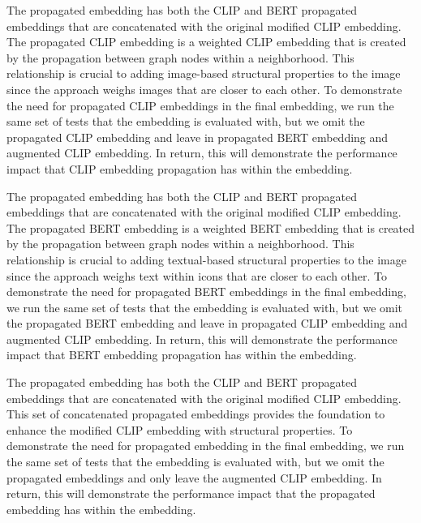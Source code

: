 
The propagated embedding has both the CLIP and BERT propagated embeddings that are concatenated with the original modified CLIP embedding. The propagated CLIP embedding is a weighted CLIP embedding that is created by the propagation between graph nodes within a neighborhood. This relationship is crucial to adding image-based structural properties to the image since the approach weighs images that are closer to each other.  To demonstrate the need for propagated CLIP embeddings in the final embedding, we run the same set of tests that the \FRAME embedding is evaluated with, but we omit the propagated CLIP embedding and leave in propagated BERT embedding and augmented CLIP embedding. In return, this will demonstrate the performance impact that CLIP embedding propagation has within the \FRAME embedding. 


The propagated embedding has both the CLIP and BERT propagated embeddings that are concatenated with the original modified CLIP embedding. The propagated BERT embedding is a weighted BERT embedding that is created by the propagation between graph nodes within a neighborhood. This relationship is crucial to adding textual-based structural properties to the image since the approach weighs text within icons that are closer to each other.  To demonstrate the need for propagated BERT embeddings in the final embedding, we run the same set of tests that the \FRAME embedding is evaluated with, but we omit the propagated BERT embedding and leave in propagated CLIP embedding and augmented CLIP embedding. In return, this will demonstrate the performance impact that BERT embedding propagation has within the \FRAME embedding. 


The propagated embedding has both the CLIP and BERT propagated embeddings that are concatenated with the original modified CLIP embedding. This set of concatenated propagated embeddings provides the foundation to enhance the modified CLIP embedding with structural properties. To demonstrate the need for propagated embedding in the final embedding, we run the same set of tests that the \FRAME embedding is evaluated with, but we omit the propagated embeddings and only leave the augmented CLIP embedding. In return, this will demonstrate the performance impact that the propagated embedding has within the \FRAME embedding.

